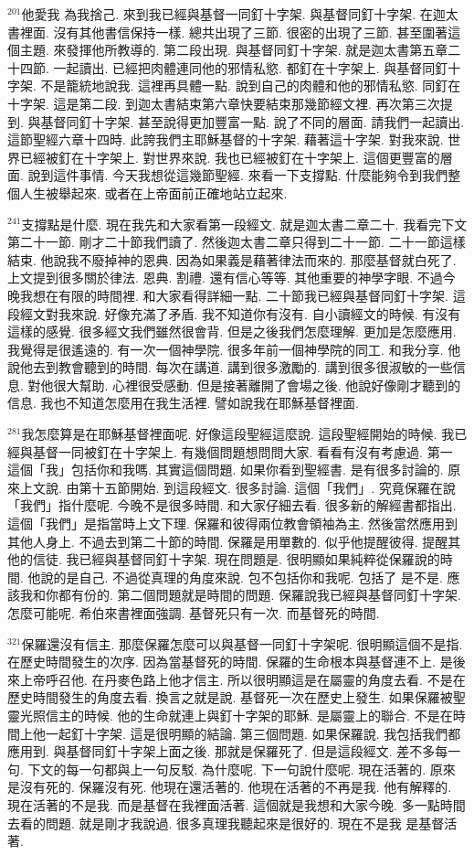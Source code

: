 \documentclass{book}
\begin{document}
$^{201}$他愛我 為我捨己.
來到我已經與基督一同釘十字架.
與基督同釘十字架.
在迦太書裡面.
沒有其他書信保持一樣.
總共出現了三節.
很密的出現了三節.
甚至圍著這個主題.
來發揮他所教導的.
第二段出現.
與基督同釘十字架.
就是迦太書第五章二十四節.
一起讀出.
已經把肉體連同他的邪情私慾.
都釘在十字架上.
與基督同釘十字架.
不是籠統地說我.
這裡再具體一點.
說到自己的肉體和他的邪情私慾.
同釘在十字架.
這是第二段.
到迦太書結束第六章快要結束那幾節經文裡.
再次第三次提到.
與基督同釘十字架.
甚至說得更加豐富一點.
說了不同的層面.
請我們一起讀出.
這節聖經六章十四時.
此誇我們主耶穌基督的十字架.
藉著這十字架.
對我來說.
世界已經被釘在十字架上.
對世界來說.
我也已經被釘在十字架上.
這個更豐富的層面.
說到這件事情.
今天我想從這幾節聖經.
來看一下支撐點.
什麼能夠令到我們整個人生被舉起來.
或者在上帝面前正確地站立起來.

$^{241}$支撐點是什麼.
現在我先和大家看第一段經文.
就是迦太書二章二十.
我看完下文第二十一節.
剛才二十節我們讀了.
然後迦太書二章只得到二十一節.
二十一節這樣結束.
他說我不廢掉神的恩典.
因為如果義是藉著律法而來的.
那麼基督就白死了.
上文提到很多關於律法.
恩典.
割禮.
還有信心等等.
其他重要的神學字眼.
不過今晚我想在有限的時間裡.
和大家看得詳細一點.
二十節我已經與基督同釘十字架.
這段經文對我來說.
好像充滿了矛盾.
我不知道你有沒有.
自小讀經文的時候.
有沒有這樣的感覺.
很多經文我們雖然很會背.
但是之後我們怎麼理解.
更加是怎麼應用.
我覺得是很遙遠的.
有一次一個神學院.
很多年前一個神學院的同工.
和我分享.
他說他去到教會聽到的時間.
每次在講道.
講到很多激勵的.
講到很多很淑敏的一些信息.
對他很大幫助.
心裡很受感動.
但是接著離開了會場之後.
他說好像剛才聽到的信息.
我也不知道怎麼用在我生活裡.
譬如說我在耶穌基督裡面.

$^{281}$我怎麼算是在耶穌基督裡面呢.
好像這段聖經這麼說.
這段聖經開始的時候.
我已經與基督一同被釘在十字架上.
有幾個問題想問問大家.
看看有沒有考慮過.
第一 這個「我」包括你和我嗎.
其實這個問題.
如果你看到聖經書.
是有很多討論的.
原來上文說.
由第十五節開始.
到這段經文.
很多討論.
這個「我們」.
究竟保羅在說「我們」指什麼呢.
今晚不是很多時間.
和大家仔細去看.
很多新的解經書都指出.
這個「我們」是指當時上文下理.
保羅和彼得兩位教會領袖為主.
然後當然應用到其他人身上.
不過去到第二十節的時間.
保羅是用單數的.
似乎他提醒彼得.
提醒其他的信徒.
我已經與基督同釘十字架.
現在問題是.
很明顯如果純粹從保羅說的時間.
他說的是自己.
不過從真理的角度來說.
包不包括你和我呢.
包括了 是不是.
應該我和你都有份的.
第二個問題就是時間的問題.
保羅說我已經與基督同釘十字架.
怎麼可能呢.
希伯來書裡面強調.
基督死只有一次.
而基督死的時間.

$^{321}$保羅還沒有信主.
那麼保羅怎麼可以與基督一同釘十字架呢.
很明顯這個不是指.
在歷史時間發生的次序.
因為當基督死的時間.
保羅的生命根本與基督連不上.
是後來上帝呼召他.
在丹麥色路上他才信主.
所以很明顯這是在屬靈的角度去看.
不是在歷史時間發生的角度去看.
換言之就是說.
基督死一次在歷史上發生.
如果保羅被聖靈光照信主的時候.
他的生命就連上與釘十字架的耶穌.
是屬靈上的聯合.
不是在時間上他一起釘十字架.
這是很明顯的結論.
第三個問題.
如果保羅說.
我包括我們都應用到.
與基督同釘十字架上面之後.
那就是保羅死了.
但是這段經文.
差不多每一句.
下文的每一句都與上一句反駁.
為什麼呢.
下一句說什麼呢.
現在活著的.
原來是沒有死的.
保羅沒有死.
他現在還活著的.
他現在活著的不再是我.
他有解釋的.
現在活著的不是我.
而是基督在我裡面活著.
這個就是我想和大家今晚.
多一點時間去看的問題.
就是剛才我說過.
很多真理我聽起來是很好的.
現在不是我 是基督活著.
\end{document}

